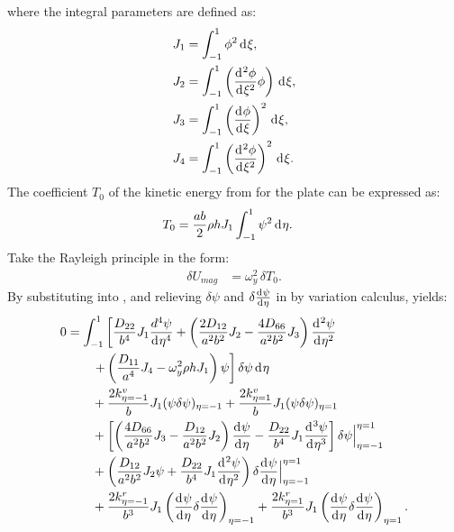 \documentclass[preprint,12pt]{elsarticle}
\newcommand{\id}{\mathrm{d}\mkern1mu}
\begin{document}
%
where the integral parameters are defined as:  
%
\begin{equation}\label{eq:inte_psi}  
	\begin{split}  
		&J_1 = \int_{-1}^{1} \phi^2 \, \id\xi, \\  
		&J_2 = \int_{-1}^{1} \left( \frac{\id^2\phi}{\id\xi^2} \phi \right) \, \id\xi, \\  
		&J_3 = \int_{-1}^{1} \left( \frac{\id\phi}{\id\xi} \right)^2 \, \id\xi, \\  
		&J_4 = \int_{-1}^{1} \left( \frac{\id^2\phi}{\id\xi^2} \right)^2 \, \id\xi.  
	\end{split}  
\end{equation}  
%
The coefficient $T_0$ of the kinetic energy from  for the plate can be expressed as:
%
\begin{equation}\label{eq:kine_energyy}
	\begin{split}
		T_0 &= \frac{ab}{2} \rho h J_1 \int_{-1}^{1} \psi^2 \, \id\eta.
	\end{split}
\end{equation}
%
Take the Rayleigh principle in the form:
%
\begin{equation}\label{eq:Rayleighy}
	\begin{split}
		\delta U_{mag} &= \omega_y^2 \, \delta T_0.
	\end{split}
\end{equation}
%
By substituting  into , and relieving $ \delta \psi $ and $\delta\frac{\id \psi}{\id \eta}$ in  by variation calculus, yields:
%
\begin{equation}\label{eq:Rayleighy2}
	\begin{split}
		0 &= \int_{-1}^{1} \left[ \frac{D_{22}}{b^4} J_1 \frac{d^4 \psi}{\id \eta^4} 
		+ \left( \frac{2D_{12}}{a^2b^2} J_2 - \frac{4D_{66}}{a^2b^2} J_3 \right) \frac{\id^2 \psi}{\id \eta^2} \right. \\
		&\qquad \left. + \left( \frac{D_{11}}{a^4} J_4 - \omega_y^2 \rho h J_1 \right) \psi \right] \delta \psi \, \id\eta \\
		&\qquad + \frac{2k^v_{\eta=-1}}{b} J_1 (\psi \delta \psi)_{\eta=-1} 
		+ \frac{2k^v_{\eta=1}}{b} J_1 (\psi \delta \psi)_{\eta=1} \\
		&\qquad + \left[ \left( \frac{4D_{66}}{a^2b^2} J_3 - \frac{D_{12}}{a^2b^2} J_2 \right) \frac{\id \psi}{\id \eta} 
		- \frac{D_{22}}{b^4} J_1 \frac{\id^3 \psi}{\id \eta^3} \right] \delta \psi \Big|^{\eta=1}_{\eta=-1} \\
		&\qquad + \left( \frac{D_{12}}{a^2b^2} J_2 \psi + \frac{D_{22}}{b^4} J_1 \frac{\id^2 \psi}{\id \eta^2} \right) 
		\delta\frac{\id  \psi}{\id \eta} \Big|^{\eta=1}_{\eta=-1} \\
		&\qquad + \frac{2k^r_{\eta=-1}}{b^3} J_1 \left( \frac{\id \psi}{\id \eta} \delta\frac{\id \psi}{\id \eta} \right)_{\eta=-1} 
		+ \frac{2k^r_{\eta=1}}{b^3} J_1 \left( \frac{\id \psi}{\id \eta} \delta\frac{\id \psi}{\id \eta} \right)_{\eta=1}.
	\end{split}
\end{equation}
\end{document}
